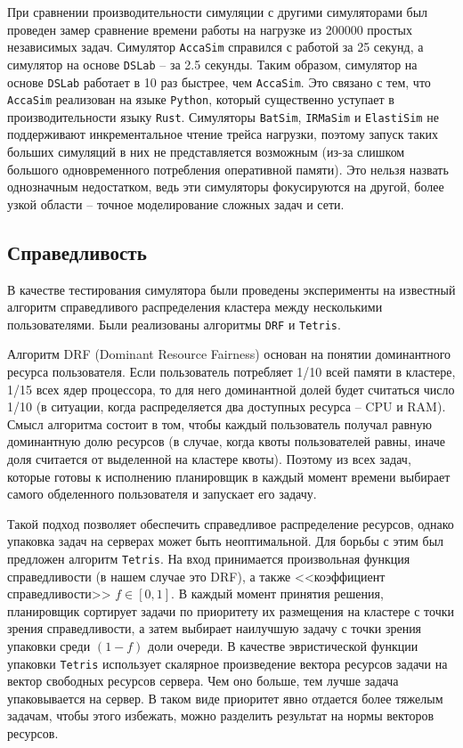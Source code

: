 При сравнении производительности симуляции с другими симуляторами был проведен замер сравнение времени работы на нагрузке из 200000 простых независимых задач. Симулятор \texttt{AccaSim} справился с работой за 25 секунд, а симулятор на основе \texttt{DSLab} -- за 2.5 секунды. Таким образом, симулятор на основе \texttt{DSLab} работает в 10 раз быстрее, чем \texttt{AccaSim}. Это связано с тем, что \texttt{AccaSim} реализован на языке \texttt{Python}, который существенно уступает в производительности языку \texttt{Rust}. Симуляторы \texttt{BatSim}, \texttt{IRMaSim} и \texttt{ElastiSim} не поддерживают инкрементальное чтение трейса нагрузки, поэтому запуск таких больших симуляций в них не представляется возможным (из-за слишком большого одновременного потребления оперативной памяти). Это нельзя назвать однозначным недостатком, ведь эти симуляторы фокусируются на другой, более узкой области -- точное моделирование сложных задач и сети.  

\subsection{Справедливость}\label{sec:example-fairness}

В качестве тестирования симулятора были проведены эксперименты на известный алгоритм справедливого распределения кластера между несколькими пользователями. Были реализованы алгоритмы \texttt{DRF}\cite{drf-article} и \texttt{Tetris}\cite{tetris-article}. 

Алгоритм DRF (Dominant Resource Fairness) основан на понятии доминантного ресурса пользователя. Если пользователь потребляет 1/10 всей памяти в кластере, 1/15 всех ядер процессора, то для него доминантной долей будет считаться число 1/10 (в ситуации, когда распределяется два доступных ресурса -- CPU и RAM). Смысл алгоритма состоит в том, чтобы каждый пользователь получал равную доминантную долю ресурсов (в случае, когда квоты пользователей равны, иначе доля считается от выделенной на кластере квоты). Поэтому из всех задач, которые готовы к исполнению планировщик в каждый момент времени выбирает самого обделенного пользователя и запускает его задачу. 

Такой подход позволяет обеспечить справедливое распределение ресурсов, однако упаковка задач на серверах может быть неоптимальной. Для борьбы с этим был предложен алгоритм \texttt{Tetris}\cite{tetris-article}. На вход принимается произвольная функция справедливости (в нашем случае это DRF), а также <<коэффициент справедливости>> $f \in [0, 1]$. В каждый момент принятия решения, планировщик сортирует задачи по приоритету их размещения на кластере с точки зрения справедливости, а затем выбирает наилучшую задачу с точки зрения упаковки среди $(1 - f)$ доли очереди. В качестве эвристической функции упаковки \texttt{Tetris} использует скалярное произведение вектора ресурсов задачи на вектор свободных ресурсов сервера. Чем оно больше, тем лучше задача упаковывается на сервер. В таком виде приоритет явно отдается более тяжелым задачам, чтобы этого избежать, можно разделить результат на нормы векторов ресурсов. 

